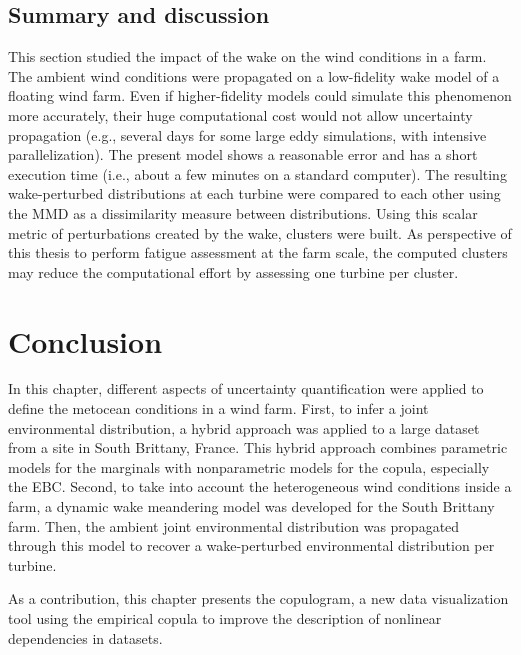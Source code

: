 \subsection{Summary and discussion}
This section studied the impact of the wake on the wind conditions in a farm. 
The ambient wind conditions were propagated on a low-fidelity wake model of a floating wind farm. 
Even if higher-fidelity models could simulate this phenomenon more accurately, their huge computational cost would not allow uncertainty propagation (e.g., several days for some large eddy simulations, with intensive parallelization). 
The present model shows a reasonable error and has a short execution time (i.e., about a few minutes on a standard computer). 
The resulting wake-perturbed distributions at each turbine were compared to each other using the MMD as a dissimilarity measure between distributions. 
Using this scalar metric of perturbations created by the wake, clusters were built.  
As perspective of this thesis to perform fatigue assessment at the farm scale, the computed clusters may reduce the computational effort by assessing one turbine per cluster.    


\section{Conclusion}

In this chapter, different aspects of uncertainty quantification were applied to define the metocean conditions in a wind farm. 
First, to infer a joint environmental distribution, a hybrid approach was applied to a large dataset from a site in South Brittany, France. 
This hybrid approach combines parametric models for the marginals with nonparametric models for the copula, especially the EBC.  
Second, to take into account the heterogeneous wind conditions inside a farm, a dynamic wake meandering model was developed for the South Brittany farm. 
Then, the ambient joint environmental distribution was propagated through this model to recover a wake-perturbed environmental distribution per turbine.  

As a contribution, this chapter presents the copulogram, a new data visualization tool using the empirical copula to improve the description of nonlinear dependencies in datasets.  

